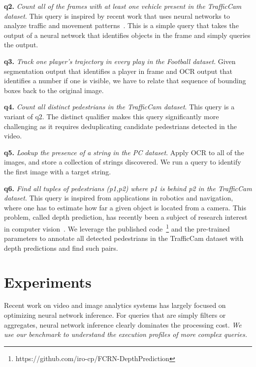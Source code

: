 \vspace{0.25em} \noindent \textbf{q2.} \emph{Count all of the frames with at least one vehicle present in the TrafficCam dataset}. This query is inspired by recent work that uses neural networks to analyze traffic and movement patterns~\cite{kang2017noscope}. This is a simple query that takes the output of a neural network that identifies objects in the frame and simply queries the output.

\vspace{0.25em} \noindent \textbf{q3.} \emph{Track one player's trajectory in every play in the Football dataset}. Given segmentation output that identifies a player in frame and OCR output that identifies a number if one is visible, we have to relate that sequence of bounding boxes back to the original image.

\vspace{0.25em} \noindent \textbf{q4.} \emph{Count all distinct pedestrians in the TrafficCam dataset}. This query is a variant of q2. The distinct qualifier makes this query significantly more challenging as it requires deduplicating candidate pedestrians detected in the video.

\vspace{0.25em} \noindent \textbf{q5.} \emph{Lookup the presence of a string in the PC dataset}. Apply OCR to all of the images, and store a collection of strings discovered. We run a query to identify the first image with a target string.

\vspace{0.25em} \noindent \textbf{q6.} \emph{Find all tuples of pedestrians (p1,p2) where p1 is behind p2 in the TrafficCam dataset}. This query is inspired from applications in robotics and navigation, where one has to estimate how far a given object is located from a camera. This problem, called depth prediction, has recently been a subject of research interest in computer vision~\cite{depthPredictModel}. We leverage the published code~\footnote{https://github.com/iro-cp/FCRN-DepthPrediction} and the pre-trained parameters to annotate all detected pedestrians in the TrafficCam dataset with depth predictions and find such pairs.

\section{Experiments}
Recent work on video and image analytics systems has largely focused on optimizing neural network inference.
For queries that are simply filters or aggregates, neural network inference clearly dominates the processing cost.
\emph{We use our benchmark to understand the execution profiles of more complex queries.}


